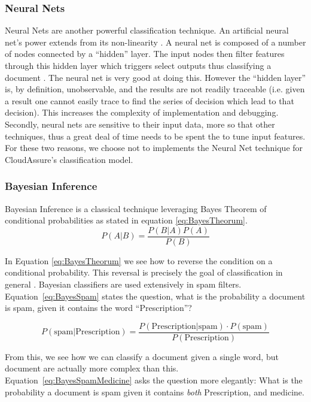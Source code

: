 \subsubsection{Neural Nets}
Neural Nets are another powerful classification technique. An artificial neural
net's power
extends from its non-linearity \autocite{Zhang2000}. A neural net is composed of
a number of nodes connected by a ``hidden'' layer. The input nodes
then filter features through this hidden layer which triggers select outputs
thus classifying a document \autocite{Merkl}. The neural net is very good at
doing this. However the ``hidden layer'' is, by definition, unobservable, and
the results are not readily traceable (i.e. given a result one cannot easily trace to
find the series of decision which lead to that decision). This increases the
complexity of implementation and debugging. Secondly, neural nets are sensitive
to their input data, more so that other techniques, thus a great deal of time
needs to be spent the to tune input features. For these two reasons, we choose not
to implements the Neural Net technique for CloudAssure's classification model.

\subsubsection{Bayesian Inference}
Bayesian Inference is a classical technique leveraging Bayes Theorem of
conditional probabilities as stated in equation \ref{eq:BayesTheorum}.
\begin{equation}
    P(A|B) = \frac{P(B | A) P(A)}{P(B)}
    \label{eq:BayesTheorum}
\end{equation}

In Equation \ref{eq:BayesTheorum} we see how to reverse the condition on
a conditional probability.  This reversal is precisely the goal of
classification in general \autocite{Bishop2009}. Bayesian classifiers are used
extensively in spam filters. Equation~\ref{eq:BayesSpam} states the
question, what is the probability a document is spam, given it contains the word
``Prescription''? 

\begin{equation}
    P(\text{spam} | \text{Prescription}) = \frac{P(\text{Prescription}
    | \text{spam}) \cdot P(\text{spam})}{P(\text{Prescription})}
    \label{eq:BayesSpam}
\end{equation}

From this, we see how we can classify a document given a single word, but
document are actually more complex than this.
Equation~\ref{eq:BayesSpamMedicine} asks the question more elegantly: What is
the probability a document is spam given it contains \emph{both} Prescription, and
medicine. 

